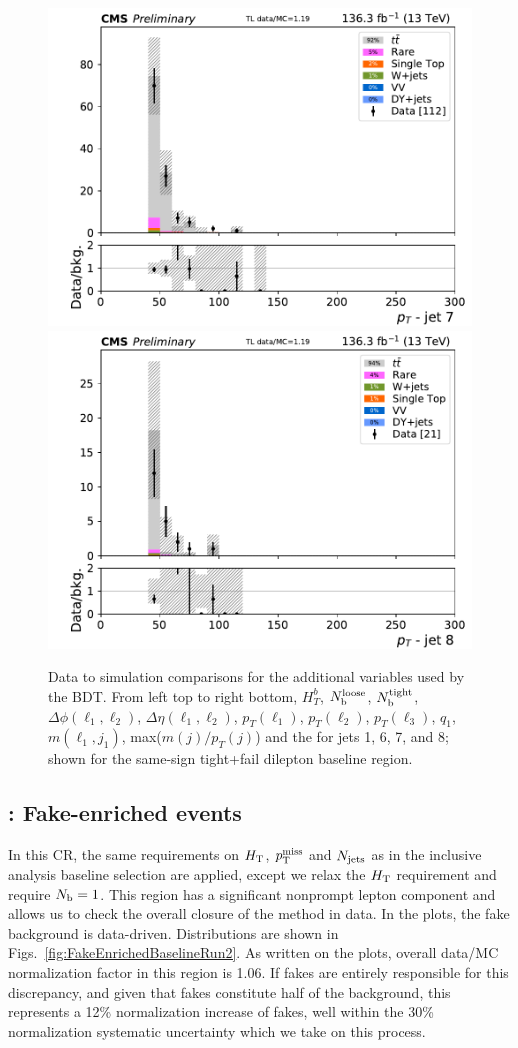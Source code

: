 \begin{figure}[!htb]
\includegraphics[width=0.32\linewidth]{figs/ftan/cr/run2_tl_ptj7_in.pdf}
\includegraphics[width=0.32\linewidth]{figs/ftan/cr/run2_tl_ptj8_in.pdf}
\caption{ Data to simulation comparisons for the additional variables used by the BDT. From left top to right bottom,
    $H_{T}^b$, $N_\mathrm{b}^\text{loose}$, $N_\mathrm{b}^\text{tight}$, $\Delta \phi(\ell_{1},\ell_2)$, 
$\Delta \eta(\ell_{1},\ell_{2})$, $p_T(\ell_1)$, $p_T(\ell_2)$, $p_T(\ell_3)$,
    $q_1$, $m(\ell_1,j_1)$, max($m(j)/p_T(j)$) and the \pt for jets 1, 6, 7, and 8;
shown for the same-sign tight+fail dilepton baseline region. }
\label{fig:TightFailBaselineExtraRun2}
\end{figure}

\FloatBarrier

\subsection{\smft: Fake-enriched events}\label{sec:FECR}

In this CR, the same requirements on $H_{\mathrm{T}}$, $p_{\mathrm{T}}^\text{miss}$
and $N_\text{jets}$ as in the inclusive \smft analysis baseline selection are applied,
except we relax the $H_{\mathrm{T}}$ requirement
and require $N_\mathrm{b}=1$.
This region has a significant nonprompt lepton component and allows us to check the
overall closure of the method in data. In the plots, the fake background is data-driven.
Distributions are shown in Figs.~\ref{fig:FakeEnrichedBaselineRun2}.
As written on the plots, overall data/MC normalization factor in this region is 1.06. 
If fakes are entirely responsible for this discrepancy,
and given that fakes constitute half of the background, this
represents a 12\% normalization increase of fakes, well within the 30\% normalization
systematic uncertainty which we take on this process.

